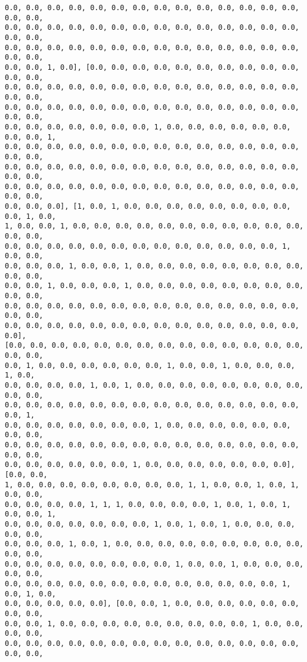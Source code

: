 \documentclass[11pt]{article}
\begin{document}
\begin{Verbatim}[commandchars=\\\{\}]
0.0, 0.0, 0.0, 0.0, 0.0, 0.0, 0.0, 0.0, 0.0, 0.0, 0.0, 0.0, 0.0, 0.0, 0.0, 0.0,
0.0, 0.0, 0.0, 0.0, 0.0, 0.0, 0.0, 0.0, 0.0, 0.0, 0.0, 0.0, 0.0, 0.0, 0.0, 0.0,
0.0, 0.0, 0.0, 0.0, 0.0, 0.0, 0.0, 0.0, 0.0, 0.0, 0.0, 0.0, 0.0, 0.0, 0.0, 0.0,
0.0, 0.0, 1, 0.0], [0.0, 0.0, 0.0, 0.0, 0.0, 0.0, 0.0, 0.0, 0.0, 0.0, 0.0, 0.0,
0.0, 0.0, 0.0, 0.0, 0.0, 0.0, 0.0, 0.0, 0.0, 0.0, 0.0, 0.0, 0.0, 0.0, 0.0, 0.0,
0.0, 0.0, 0.0, 0.0, 0.0, 0.0, 0.0, 0.0, 0.0, 0.0, 0.0, 0.0, 0.0, 0.0, 0.0, 0.0,
0.0, 0.0, 0.0, 0.0, 0.0, 0.0, 0.0, 1, 0.0, 0.0, 0.0, 0.0, 0.0, 0.0, 0.0, 0.0, 1,
0.0, 0.0, 0.0, 0.0, 0.0, 0.0, 0.0, 0.0, 0.0, 0.0, 0.0, 0.0, 0.0, 0.0, 0.0, 0.0,
0.0, 0.0, 0.0, 0.0, 0.0, 0.0, 0.0, 0.0, 0.0, 0.0, 0.0, 0.0, 0.0, 0.0, 0.0, 0.0,
0.0, 0.0, 0.0, 0.0, 0.0, 0.0, 0.0, 0.0, 0.0, 0.0, 0.0, 0.0, 0.0, 0.0, 0.0, 0.0,
0.0, 0.0, 0.0], [1, 0.0, 1, 0.0, 0.0, 0.0, 0.0, 0.0, 0.0, 0.0, 0.0, 0.0, 1, 0.0,
1, 0.0, 0.0, 1, 0.0, 0.0, 0.0, 0.0, 0.0, 0.0, 0.0, 0.0, 0.0, 0.0, 0.0, 0.0, 0.0,
0.0, 0.0, 0.0, 0.0, 0.0, 0.0, 0.0, 0.0, 0.0, 0.0, 0.0, 0.0, 0.0, 1, 0.0, 0.0,
0.0, 0.0, 0.0, 1, 0.0, 0.0, 1, 0.0, 0.0, 0.0, 0.0, 0.0, 0.0, 0.0, 0.0, 0.0, 0.0,
0.0, 0.0, 1, 0.0, 0.0, 0.0, 1, 0.0, 0.0, 0.0, 0.0, 0.0, 0.0, 0.0, 0.0, 0.0, 0.0,
0.0, 0.0, 0.0, 0.0, 0.0, 0.0, 0.0, 0.0, 0.0, 0.0, 0.0, 0.0, 0.0, 0.0, 0.0, 0.0,
0.0, 0.0, 0.0, 0.0, 0.0, 0.0, 0.0, 0.0, 0.0, 0.0, 0.0, 0.0, 0.0, 0.0, 0.0],
[0.0, 0.0, 0.0, 0.0, 0.0, 0.0, 0.0, 0.0, 0.0, 0.0, 0.0, 0.0, 0.0, 0.0, 0.0, 0.0,
0.0, 1, 0.0, 0.0, 0.0, 0.0, 0.0, 0.0, 1, 0.0, 0.0, 1, 0.0, 0.0, 0.0, 1, 0.0,
0.0, 0.0, 0.0, 0.0, 1, 0.0, 1, 0.0, 0.0, 0.0, 0.0, 0.0, 0.0, 0.0, 0.0, 0.0, 0.0,
0.0, 0.0, 0.0, 0.0, 0.0, 0.0, 0.0, 0.0, 0.0, 0.0, 0.0, 0.0, 0.0, 0.0, 0.0, 1,
0.0, 0.0, 0.0, 0.0, 0.0, 0.0, 0.0, 1, 0.0, 0.0, 0.0, 0.0, 0.0, 0.0, 0.0, 0.0,
0.0, 0.0, 0.0, 0.0, 0.0, 0.0, 0.0, 0.0, 0.0, 0.0, 0.0, 0.0, 0.0, 0.0, 0.0, 0.0,
0.0, 0.0, 0.0, 0.0, 0.0, 0.0, 1, 0.0, 0.0, 0.0, 0.0, 0.0, 0.0, 0.0], [0.0, 0.0,
1, 0.0, 0.0, 0.0, 0.0, 0.0, 0.0, 0.0, 0.0, 1, 1, 0.0, 0.0, 1, 0.0, 1, 0.0, 0.0,
0.0, 0.0, 0.0, 0.0, 1, 1, 1, 0.0, 0.0, 0.0, 0.0, 1, 0.0, 1, 0.0, 1, 0.0, 0.0, 1,
0.0, 0.0, 0.0, 0.0, 0.0, 0.0, 0.0, 1, 0.0, 1, 0.0, 1, 0.0, 0.0, 0.0, 0.0, 0.0,
0.0, 0.0, 0.0, 1, 0.0, 1, 0.0, 0.0, 0.0, 0.0, 0.0, 0.0, 0.0, 0.0, 0.0, 0.0, 0.0,
0.0, 0.0, 0.0, 0.0, 0.0, 0.0, 0.0, 0.0, 1, 0.0, 0.0, 1, 0.0, 0.0, 0.0, 0.0, 0.0,
0.0, 0.0, 0.0, 0.0, 0.0, 0.0, 0.0, 0.0, 0.0, 0.0, 0.0, 0.0, 0.0, 1, 0.0, 1, 0.0,
0.0, 0.0, 0.0, 0.0, 0.0], [0.0, 0.0, 1, 0.0, 0.0, 0.0, 0.0, 0.0, 0.0, 0.0, 0.0,
0.0, 0.0, 1, 0.0, 0.0, 0.0, 0.0, 0.0, 0.0, 0.0, 0.0, 0.0, 1, 0.0, 0.0, 0.0, 0.0,
0.0, 0.0, 0.0, 0.0, 0.0, 0.0, 0.0, 0.0, 0.0, 0.0, 0.0, 0.0, 0.0, 0.0, 0.0, 0.0,

\end{Verbatim}
\end{document}
